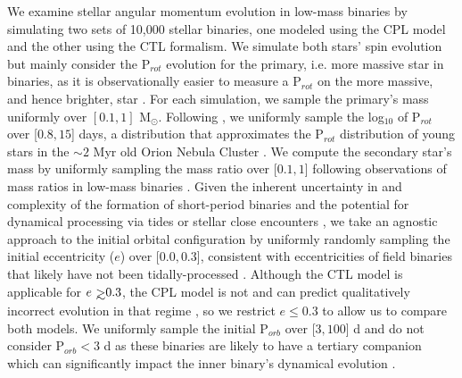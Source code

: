 We examine stellar angular momentum evolution in low-mass binaries by simulating two sets of 10,000 stellar binaries, one modeled using the CPL model and the other using the CTL formalism.  We simulate both stars' spin evolution but mainly consider the P$_{rot}$ evolution for the primary, i.e. more massive star in binaries, as it is observationally easier to measure a P$_{rot}$ on the more massive, and hence brighter, star \citep[e.g.][]{Meibom2006,Lurie2017}. For each simulation, we sample the primary's mass uniformly over $[0.1, 1]$ M$_{\odot}$. Following \citet{Matt2015}, we uniformly sample the log$_{10}$ of P$_{rot}$ over [$0.8,15$] days, a distribution that approximates the P$_{rot}$ distribution of young stars in the ${\sim}2$ Myr old Orion Nebula Cluster \citep{Stassun1999,Herbst2001,Herbst2002,Rodriguez-Ledesma2009}.  We compute the secondary star's mass by uniformly sampling the mass ratio over [$0.1, 1$] following observations of mass ratios in low-mass binaries \citep{Raghavan2010,Moe2018}. Given the inherent uncertainty in and complexity of the formation of short-period binaries \citep[e.g.][]{Bonnell1994,Bate2000,Bate2002,Moe2018} and the potential for dynamical processing via tides or stellar close encounters \citep[e.g.][]{Mardling2001,Hurley2002,Ivanova2005,Meibom2005}, we take an agnostic approach to the initial orbital configuration by uniformly randomly sampling the initial eccentricity ($e$) over [$0.0,0.3$], consistent with eccentricities of field binaries that likely have not been tidally-processed \citep{Raghavan2010}. Although the CTL model is applicable for $e \gsim 0.3$, the CPL model is not and can predict qualitatively incorrect evolution in that regime \citep[see Section 4.1 in][]{Leconte2010}, so we restrict $e \leq 0.3$ to allow us to compare both models. We uniformly sample the initial P$_{orb}$ over [$3,100$] d and do not consider P$_{orb} < 3$ d as these binaries are likely to have a tertiary companion \citep{Tokovinin2006} which can significantly impact the inner binary's dynamical evolution \citep[e.g.][]{Fabrycky2007,Munoz2015,Martin2015b,Hamers2016,Moe2018}. 

